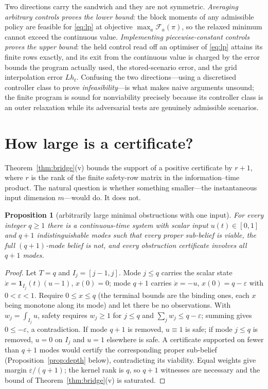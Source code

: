\documentclass[11pt,a4paper]{article}
\theoremstyle{plain}
\newtheorem{proposition}[theorem]{Proposition}
\theoremstyle{definition}
\theoremstyle{remark}
\newcommand{\calF}{\mathcal{F}}
\begin{document}
Two directions carry the sandwich and they are not symmetric. \emph{Averaging arbitrary controls proves the lower bound}: the block moments of any admissible policy are feasible for \eqref{eq:lp} at objective $\max_a\calF_a(\pi)$, so the relaxed minimum cannot exceed the continuous value. \emph{Implementing piecewise-constant controls proves the upper bound}: the held control read off an optimiser of \eqref{eq:lp} attains its finite rows exactly, and its exit from the continuous value is charged by the error bounds the program actually used, the stored-scenario error, and the grid interpolation error $Lh_t$. Confusing the two directions---using a discretised controller class to prove \emph{infeasibility}---is what makes naive arguments unsound; the finite program is sound for nonviability precisely because its controller class is an outer relaxation while its adversarial tests are genuinely admissible scenarios.
\section{How large is a certificate?}\label{sec:size}

Theorem~\ref{thm:bridge}(v) bounds the support of a positive certificate by $r+1$, where $r$ is the rank of the finite safety-row matrix in the information--time product. The natural question is whether something smaller---the instantaneous input dimension $m$---would do. It does not.

\begin{proposition}[arbitrarily large minimal obstructions with one input]\label{prop:rank}
For every integer $q\ge1$ there is a continuous-time system with scalar input $u(t)\in[0,1]$ and $q+1$ indistinguishable modes such that every proper sub-belief is viable, the full $(q{+}1)$-mode belief is not, and every obstruction certificate involves all $q+1$ modes.
\end{proposition}

\begin{proof}
Let $T=q$ and $I_j=[j-1,j]$. Mode $j\le q$ carries the scalar state $\dot x=\mathbf 1_{I_j}(t)(u-1)$, $x(0)=0$; mode $q+1$ carries $\dot x=-u$, $x(0)=q-\varepsilon$ with $0<\varepsilon<1$. Require $0\le x\le q$ (the terminal bounds are the binding ones, each $x$ being monotone along its mode) and let there be no observations. With $w_j=\int_{I_j}u$, safety requires $w_j\ge1$ for $j\le q$ and $\sum_jw_j\le q-\varepsilon$; summing gives $0\le-\varepsilon$, a contradiction. If mode $q+1$ is removed, $u\equiv1$ is safe; if mode $j\le q$ is removed, $u=0$ on $I_j$ and $u=1$ elsewhere is safe. A certificate supported on fewer than $q+1$ modes would certify the corresponding proper sub-belief (Proposition~\ref{prop:depth} below), contradicting its viability. Equal weights give margin $\varepsilon/(q+1)$; the kernel rank is $q$, so $q+1$ witnesses are necessary and the bound of Theorem~\ref{thm:bridge}(v) is saturated.
\end{proof}
\end{document}
